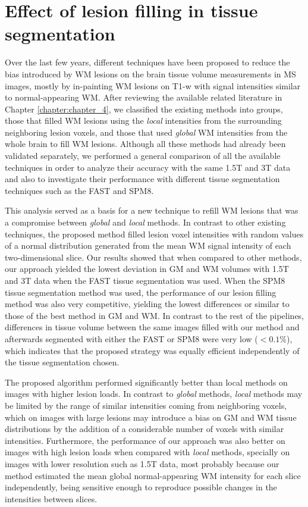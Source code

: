 \section{Effect of lesion filling in tissue segmentation}

Over the last few years, different techniques have been proposed to reduce the bias introduced by WM lesions on the brain tissue volume measurements in MS images, mostly by in-painting WM lesions on T1-w with signal intensities similar to normal-appearing WM.  After reviewing the  available related literature in Chapter \ref{chapter:chapter_4}, we classified the existing methods into groups, those that filled WM lesions using the \textit{local} intensities from the surrounding neighboring lesion voxels, and those that used \textit{global} WM intensities from the whole brain to fill WM lesions. Although all these methods had already been validated separately, we performed a general comparison of all the available techniques in order to analyze their accuracy with the same 1.5T and 3T data and also to investigate their performance with different tissue segmentation techniques such as the FAST and SPM8.

This analysis served as a basis for a new technique to refill WM lesions that was a compromise between \textit{global} and \textit{local} methods. In contrast to other existing techniques, the proposed method filled lesion voxel intensities with random values of a normal distribution generated from the mean WM signal intensity of each two-dimensional slice. Our results showed that when compared to other methods, our approach yielded the lowest deviation in GM and WM volumes with 1.5T and 3T data when the FAST tissue segmentation was used. When the SPM8 tissue segmentation method was used, the performance of our lesion filling method was also very competitive, yielding the lowest differences or similar to those of the best method in GM and WM. In contrast to the rest of the pipelines, differences in tissue volume between the same images filled with our method and afterwards segmented with either the FAST or SPM8 were very low ($<0.1\%$), which indicates that the proposed strategy was equally efficient independently of the tissue segmentation chosen.

The proposed algorithm performed significantly better than local methods on images with higher lesion loads. In contrast to \textit{global} methods, \textit{local} methods may be limited by the range of similar intensities coming from neighboring voxels, which on images with large lesions may introduce a bias on GM and WM tissue distributions by the addition of a considerable number of voxels with similar intensities. Furthermore, the performance of our approach was also better on images with high lesion loads when compared with \textit{local} methods, specially on images with lower resolution such as 1.5T data, most probably because our method estimated the mean global normal-appearing WM intensity for each slice independently, being sensitive enough to reproduce possible changes in the intensities between slices.


